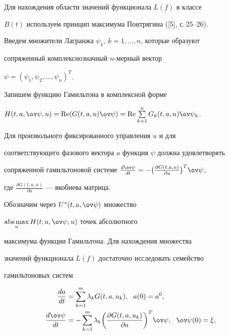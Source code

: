  


Для нахождения области значений функционала $L(f)$ в классе 


$B(t)$ используем принцип максимума Понтрягина ([5], с.\,25--26). 


Введем множители Лагранжа $\psi_k$, $k=1,\dotsc,n$, которые образуют 


сопряженный комплекснозначный $n$-мерный вектор 


$\psi=(\psi_1,\psi_2,\dotsc,\psi_n)^T$. 


Запишем функцию Гамильтона в комплексной форме 


$H(t,a,\ov\psi,u)=\re(G(t,a,u)\ov\psi)= 


\re\sum\limits^n_{k=1}G_k(t,a,u)\ov\psi_k$. 


Для произвольного фиксированного управления $u$ и для 


соответствующего фазового вектора $a$ функция $\psi$ должна удовлетворять 


сопряженной гамильтоновой системе $\frac{d\ov\psi}{d t}=-\big( 


\frac{\partial G(t,a,u)}{\partial a}\big)^T\ov\psi$, 


где $\frac{\partial G(t,a,u)}{\partial a}$ --- якобиева матрица. 


 


Обозначим через $U^*(t,a,\ov\psi)$ множество 


$\underset{u}{\text{abs\,max}}{}\,H(t,a,\ov\psi,u)$ точек абсолютного 


максимума функции Гамильтона. Для нахождения множества 


значений функционала $L(f)$ достаточно исследовать семейство 


гамильтоновых систем 


\begin{equation} 


\begin{split} 


\frac{d a}{d t}&=\sum^m_{k=1}\lambda_k G(t,a,u_k), 


\ \ a(0)=a^0,\\ 


\frac{d\ov\psi}{d t}&=-\sum^m_{k=1}\lambda_k\bigg( 


\frac{\partial G(t,a,u_k)}{\partial a}\bigg)^T\ov\psi, 


\ \ \ov\psi(0)=\xi, 


\end{split} 


\end{equation} 


